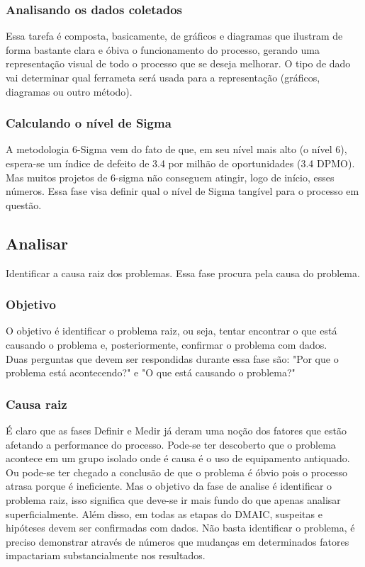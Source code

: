 \documentclass{abnt}
\begin{document}
					\subsubsection {Analisando os dados coletados}
					Essa tarefa é composta, basicamente, de gráficos e diagramas que ilustram de forma bastante clara e óbiva 
					o funcionamento do processo, gerando uma representação visual de todo o processo que se deseja melhorar. O tipo de dado vai determinar qual 
					ferrameta será usada para a representação (gráficos, diagramas ou outro método).
					\subsubsection {Calculando o nível de Sigma}
					A metodologia 6-Sigma vem do fato de que, em seu nível mais alto (o nível 6), espera-se um índice de 
					defeito de 3.4 por milhão de oportunidades (3.4 DPMO). Mas muitos projetos de 6-sigma não conseguem 
					atingir, logo de início, esses números. Essa fase visa definir qual o nível de Sigma tangível para o 
					processo em questão.
				\subsection {Analisar}
					Identificar a causa raiz dos problemas. Essa fase procura pela causa do problema.
					\subsubsection {Objetivo}
					O objetivo é identificar o problema raiz, ou seja, tentar encontrar o que está causando o problema 
					e, posteriormente, confirmar o problema com dados.\\
					Duas perguntas que devem ser respondidas durante essa fase são: "Por que o problema está acontecendo?" e 
					"O que está causando o problema?"
					\subsubsection {Causa raiz}
					É claro que as fases Definir e Medir já deram uma noção dos fatores que estão afetando a performance do processo. 
					Pode-se ter descoberto que o problema acontece em um grupo isolado onde é causa é o uso de equipamento antiquado. 
					Ou pode-se ter chegado a conclusão de que o problema é óbvio pois o processo atrasa porque é ineficiente. 
					Mas o objetivo da fase de analise é identificar o problema raiz, isso significa que deve-se ir mais fundo 
					do que apenas analisar superficialmente. Além disso, em todas as etapas do DMAIC, suspeitas e 
					hipóteses devem ser confirmadas com dados. Não basta identificar o problema, é preciso demonstrar através de números 
					que mudanças em determinados fatores impactariam substancialmente nos resultados.
\end{document}
